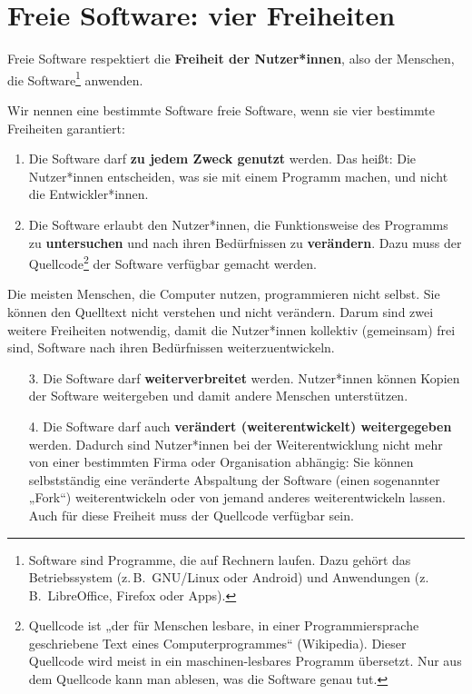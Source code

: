 \documentclass[a5paper,12pt]{scrartcl}
\begin{document}
\section{Freie Software: vier Freiheiten}

Freie Software respektiert die \textbf{Freiheit der Nutzer*innen},
also der Menschen, die Software\footnote{Software sind Programme, die
  auf Rechnern laufen. Dazu gehört das Betriebssystem (z.\,B.\
  GNU/Linux oder Android) und Anwendungen (z.\,B.\ LibreOffice,
  Firefox oder Apps).} anwenden.

Wir nennen eine bestimmte Software freie Software, wenn sie vier
bestimmte Freiheiten garantiert:
\begin{enumerate}
\item Die Software darf \textbf{zu jedem Zweck genutzt} werden. Das
  heißt: Die Nutzer*innen entscheiden, was sie mit einem Programm
  machen, und nicht die Entwickler*innen.
\item Die Software erlaubt den Nutzer*innen, die Funktionsweise des
  Programms zu \textbf{untersuchen} und nach ihren Bedürfnissen zu
  \textbf{verändern}. Dazu muss der Quellcode\footnote{Quellcode ist
    „der für Menschen lesbare, in einer Programmiersprache
    geschriebene Text eines Computerprogrammes“ (Wikipedia). Dieser
    Quellcode wird meist in ein maschinen-lesbares Programm
    übersetzt. Nur aus dem Quellcode kann man ablesen, was die
    Software genau tut.} der Software verfügbar gemacht werden.
\end{enumerate}

Die meisten Menschen, die Computer nutzen, programmieren nicht
selbst. Sie können den Quelltext nicht verstehen und nicht
verändern. Darum sind zwei weitere Freiheiten notwendig, damit die
Nutzer*innen kollektiv (gemeinsam) frei sind, Software nach ihren
Bedürfnissen weiterzuentwickeln.

\begin{enumerate}
\item[3.] Die Software darf \textbf{weiterverbreitet}
  werden. Nutzer*innen können Kopien der Software weitergeben und
  damit andere Menschen unterstützen.
\item[4.] Die Software darf auch \textbf{verändert (weiterentwickelt)
    weitergegeben} werden. Dadurch sind Nutzer*innen bei der
  Weiterentwicklung nicht mehr von einer bestimmten Firma oder
  Organisation abhängig: Sie können selbstständig eine veränderte
  Abspaltung der Software (einen sogenannter „Fork“) weiterentwickeln
  oder von jemand anderes weiterentwickeln lassen. Auch für diese
  Freiheit muss der Quellcode verfügbar sein.
\end{enumerate}
\end{document}
